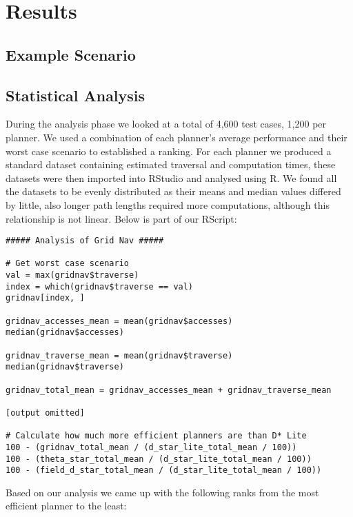 \chapter{Results}


\section{Example Scenario}

\section{Statistical Analysis}
\noindent
During the analysis phase we looked at a total of 4,600 test cases, 1,200 per planner. We used a combination of each planner's average performance and their worst case scenario to established a ranking. For each planner we produced a standard dataset containing estimated traversal and computation times, these datasets were then imported into RStudio and analysed using R. We found all the datasets to be evenly distributed as their means and median values differed by little, also longer path lengths required more computations, although this relationship is not linear. Below is part of our RScript: \\

\begin{lstlisting}
##### Analysis of Grid Nav #####

# Get worst case scenario
val = max(gridnav$traverse)
index = which(gridnav$traverse == val)
gridnav[index, ]

gridnav_accesses_mean = mean(gridnav$accesses)
median(gridnav$accesses)

gridnav_traverse_mean = mean(gridnav$traverse)
median(gridnav$traverse)

gridnav_total_mean = gridnav_accesses_mean + gridnav_traverse_mean

[output omitted]

# Calculate how much more efficient planners are than D* Lite
100 - (gridnav_total_mean / (d_star_lite_total_mean / 100))
100 - (theta_star_total_mean / (d_star_lite_total_mean / 100))
100 - (field_d_star_total_mean / (d_star_lite_total_mean / 100))
\end{lstlisting}

\noindent
Based on our analysis we came up with the following ranks from the most efficient planner to the least:

